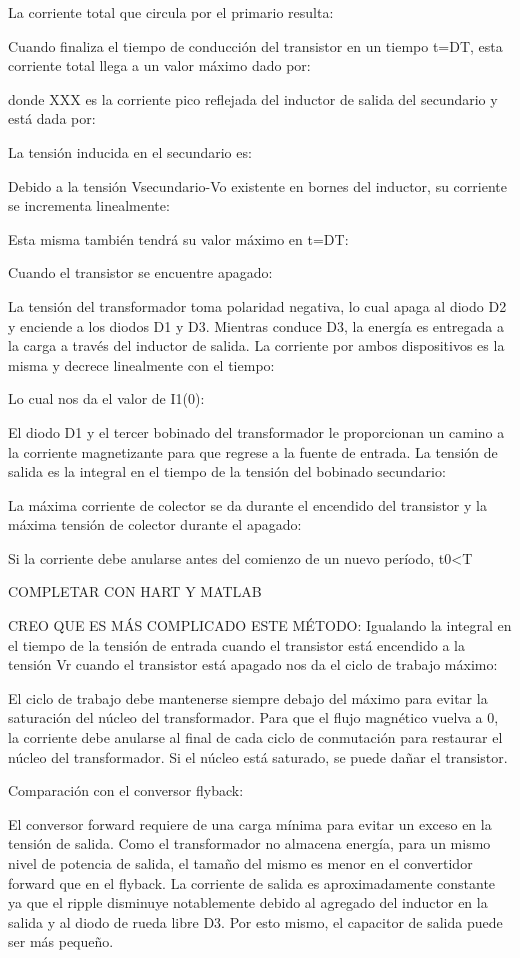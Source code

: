 La corriente total que circula por el primario resulta:

Cuando finaliza el tiempo de conducción del transistor en un tiempo t=DT, esta corriente total llega a un valor máximo dado por:

donde XXX es la corriente pico reflejada del inductor de salida del secundario y está dada por:

La tensión inducida en el secundario es:

Debido a la tensión Vsecundario-Vo existente en bornes del inductor, su corriente se incrementa linealmente:

Esta misma también tendrá su valor máximo en t=DT:


Cuando el transistor se encuentre apagado:

La tensión del transformador toma polaridad negativa, lo cual apaga al diodo D2 y enciende a los diodos D1 y D3. 
Mientras conduce D3, la energía es entregada a la carga a través del inductor de salida. 
La corriente por ambos dispositivos es la misma y decrece linealmente con el tiempo:

Lo cual nos da el valor de I1(0):


El diodo D1 y el tercer bobinado del transformador le proporcionan un camino 
a la corriente magnetizante para que regrese a la fuente de entrada. 
La tensión de salida es la integral en el tiempo de la tensión del bobinado secundario:

La máxima corriente de colector se da durante el encendido del transistor y la máxima tensión de colector durante el apagado:


Si la corriente debe anularse antes del comienzo de un nuevo período, 
t0<T

COMPLETAR CON HART Y MATLAB

CREO QUE ES MÁS COMPLICADO ESTE MÉTODO:
Igualando la integral en el tiempo de la tensión de entrada cuando el transistor está encendido a la tensión Vr cuando el transistor está apagado nos da el ciclo de trabajo máximo:


El ciclo de trabajo debe mantenerse siempre debajo del máximo para evitar la saturación del núcleo del transformador. 
Para que el flujo magnético vuelva a 0, la corriente debe anularse
 al final de cada ciclo de conmutación para restaurar el núcleo del transformador. 
Si el núcleo está saturado, se puede dañar el transistor. 

Comparación con el conversor flyback:

El conversor forward requiere de una carga mínima para evitar un exceso en la tensión de salida. 
Como el transformador no almacena energía, para un mismo nivel de potencia de salida, 
el tamaño del mismo es menor en el convertidor forward que en el flyback. 
La corriente de salida es aproximadamente constante ya que el ripple disminuye notablemente 
debido al agregado del inductor en la salida y al diodo de rueda libre D3.
Por esto mismo, el capacitor de salida puede ser más pequeño. 


